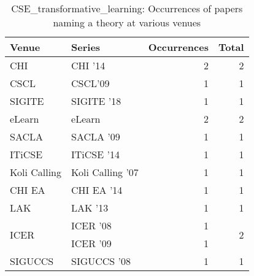 \begin{table*}[t]
\begin{tabular}{llrr}
Venue & Series & Occurrences & Total\\\hline
\multirow{1}{*}{CHI } & CHI '14 & 2 & \multirow{1}{*}{2}\\
\multirow{1}{*}{CSCL} & CSCL'09 & 1 & \multirow{1}{*}{1}\\
\multirow{1}{*}{SIGITE } & SIGITE '18 & 1 & \multirow{1}{*}{1}\\
\multirow{1}{*}{eLearn} & eLearn & 2 & \multirow{1}{*}{2}\\
\multirow{1}{*}{SACLA } & SACLA '09 & 1 & \multirow{1}{*}{1}\\
\multirow{1}{*}{ITiCSE } & ITiCSE '14 & 1 & \multirow{1}{*}{1}\\
\multirow{1}{*}{Koli Calling } & Koli Calling '07 & 1 & \multirow{1}{*}{1}\\
\multirow{1}{*}{CHI EA } & CHI EA '14 & 1 & \multirow{1}{*}{1}\\
\multirow{1}{*}{LAK } & LAK '13 & 1 & \multirow{1}{*}{1}\\
\multirow{2}{*}{ICER } & ICER '08 & 1 & \multirow{2}{*}{2}\\
& ICER '09 & 1 &\\
\multirow{1}{*}{SIGUCCS } & SIGUCCS '08 & 1 & \multirow{1}{*}{1}\\
\end{tabular}
\caption{CSE\_transformative\_learning: Occurrences of papers naming a theory at various venues}
\end{table*}